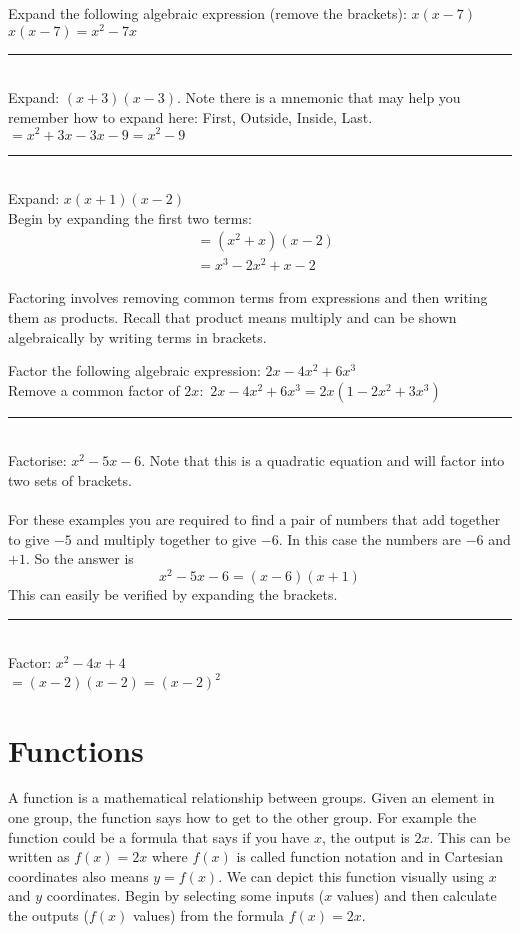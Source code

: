 \example Expand the following algebraic expression (remove the brackets): $x(x-7)$\medskip\\
\solution $x(x-7)=x^2-7x$\\
\rule{6.8cm}{0.5pt}\\
\example Expand: $(x+3)(x-3)$. Note there is a mnemonic \textbf{} that may help you remember how to expand here: First, Outside, Inside, Last.\medskip\\
\solution $=x^2+3x-3x-9=x^2-9$\\
\rule{6.8cm}{0.5pt}\\
\example Expand: $x(x+1)(x-2)$\medskip\\
\solution Begin by expanding the first two terms:
\begin{align*} &=(x^2+x)(x-2)\\
&=x^3-2x^2+x-2
\end{align*}

Factoring involves removing common terms from expressions and then writing them as products. Recall that product means multiply and can be shown algebraically by writing terms in brackets. 

\example Factor the following algebraic expression: $2x-4x^2+6x^3$\medskip\\
\solution Remove a common factor of $2x$: $\,2x-4x^2+6x^3=2x(1-2x^2+3x^3)$\\
\rule{6.8cm}{0.5pt}\\
\example Factorise: $x^{2} -5 x -6$. Note that this is a quadratic equation and will factor into two sets of brackets.\\
\solution \\
For these examples you are required to find a pair of numbers that add together to give $ -5$ and multiply together to give $ -6$. In this case the numbers are $ -6$ and $ +1$. So the answer is
\begin{equation*}x^{2} -5 x -6 =\left (x -6\right ) \left (x +1\right )
\end{equation*}
This can easily be verified by expanding the brackets.\\
\rule{6.8cm}{0.5pt}\\
\example Factor: $x^2-4x+4$\medskip\\
\solution $=(x-2)(x-2)=(x-2)^2$
	
\section{Functions}\label{sec:functions}	
A function is a mathematical relationship between groups. Given an element in one group, the function says how to get to the other group. For example the function could be a formula that says if you have $x$, the output is $2x$. This can be written as $f(x)=2x$ where $f(x)$ is called function notation and in Cartesian coordinates also means $y=f(x)$. We can depict this function visually using $x$ and $y$ coordinates. Begin by selecting some inputs ($x$ values) and then calculate the outputs ($f(x)$ values) from the formula $f(x)=2x$.

